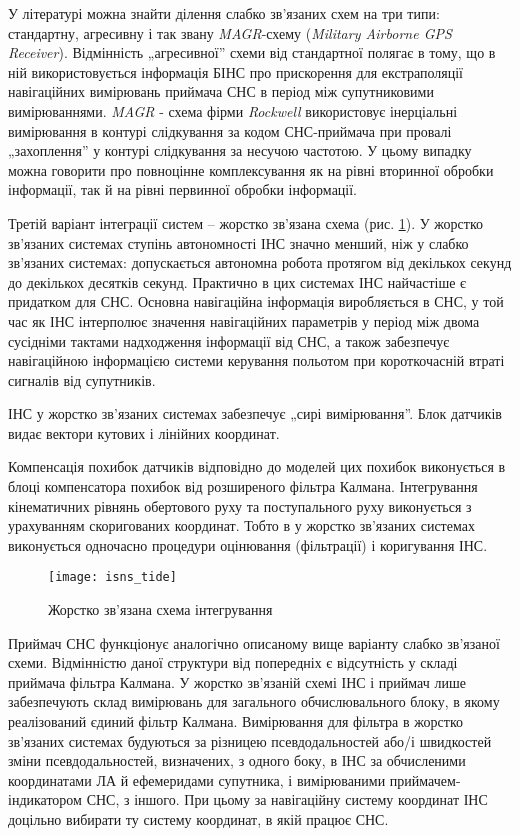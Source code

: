У літературі можна знайти ділення слабко зв'язаних схем на три типи: стандартну, агресивну 
і так звану \textit{MAGR}-схему (\textit{Military Airborne GPS Receiver}). Відмінність 
„агресивної'' схеми від стандартної полягає в тому, що в ній використовується інформація 
БІНС про прискорення для екстраполяції навігаційних вимірювань приймача СНС в період 
між супутниковими вимірюваннями. \textit{MAGR} - схема фірми \textit{Rockwell} використовує 
інерціальні вимірювання в контурі слідкування за кодом СНС-приймача при провалі „захоплення'' 
у контурі слідкування за несучою частотою. У цьому випадку можна говорити про повноцінне 
комплексування як на рівні вторинної обробки інформації, так й на рівні первинної 
обробки інформації.

Третій варіант інтеграції систем -- жорстко зв'язана схема (рис. \ref{fig:isns_tide}).
У жорстко зв'язаних системах ступінь автономності ІНС значно менший, ніж у слабко зв'язаних 
системах: допускається автономна робота протягом від декількох секунд до декількох 
десятків секунд. Практично в цих системах ІНС найчастіше є придатком для СНС. Основна 
навігаційна інформація виробляється в СНС, у той час як ІНС інтерполює значення навігаційних 
параметрів у період між двома сусідніми тактами надходження інформації від СНС, а 
також забезпечує навігаційною інформацією системи керування польотом при короткочасній 
втраті сигналів від супутників. 

ІНС у жорстко зв'язаних системах забезпечує „сирі вимірювання''. Блок датчиків видає 
вектори кутових  і лінійних координат.  

Компенсація похибок датчиків відповідно до моделей цих похибок виконується в блоці 
компенсатора похибок від розширеного фільтра Калмана. Інтегрування кінематичних рівнянь 
обертового руху та поступального руху виконується з урахуванням скоригованих координат. 
Тобто в у жорстко зв'язаних системах виконується одночасно процедури оцінювання (фільтрації) 
і коригування ІНС.
\begin{figure}[here]
\centering
\texttt{[image: isns\_tide]}
\caption{Жорстко зв'язана схема інтегрування}
\label{fig:isns_tide}
\end{figure}

Приймач СНС функціонує аналогічно описаному вище варіанту 
слабко зв'язаної схеми. Відмінністю даної структури від попередніх є відсутність 
у складі приймача фільтра Калмана. У жорстко зв'язаній схемі ІНС і приймач лише забезпечують 
склад вимірювань для загального обчислювального блоку, в якому реалізований єдиний 
фільтр Калмана. Вимірювання для фільтра в жорстко зв'язаних системах будуються за 
різницею псевдодальностей або/і швидкостей зміни псевдодальностей, визначених, з 
одного боку, в ІНС за обчисленими координатами ЛА й ефемеридами супутника, і вимірюваними 
приймачем-індикатором СНС, з іншого. При цьому за навігаційну систему координат ІНС 
доцільно вибирати ту систему координат, в якій працює СНС.  

